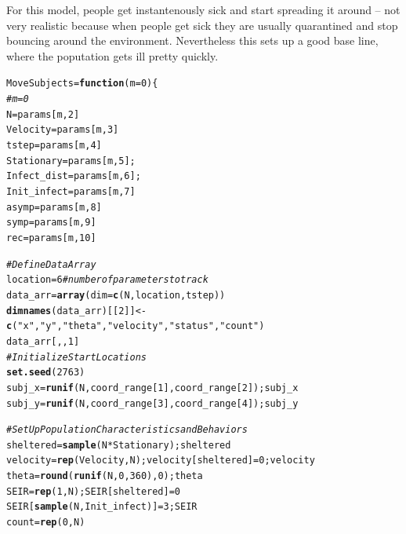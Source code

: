 \documentclass{article}\usepackage[]{graphicx}\usepackage[]{color}
\makeatletter
\newcommand{\hlnum}[1]{\textcolor[rgb]{0.686,0.059,0.569}{#1}}%
\newcommand{\hlstr}[1]{\textcolor[rgb]{0.192,0.494,0.8}{#1}}%
\newcommand{\hlcom}[1]{\textcolor[rgb]{0.678,0.584,0.686}{\textit{#1}}}%
\newcommand{\hlopt}[1]{\textcolor[rgb]{0,0,0}{#1}}%
\newcommand{\hlstd}[1]{\textcolor[rgb]{0.345,0.345,0.345}{#1}}%
\newcommand{\hlkwa}[1]{\textcolor[rgb]{0.161,0.373,0.58}{\textbf{#1}}}%
\newcommand{\hlkwb}[1]{\textcolor[rgb]{0.69,0.353,0.396}{#1}}%
\newcommand{\hlkwc}[1]{\textcolor[rgb]{0.333,0.667,0.333}{#1}}%
\newcommand{\hlkwd}[1]{\textcolor[rgb]{0.737,0.353,0.396}{\textbf{#1}}}%
\newenvironment{kframe}{%
 \def\at@end@of@kframe{}%
 \ifinner\ifhmode%
  \def\at@end@of@kframe{\end{minipage}}%
  \begin{minipage}{\columnwidth}%
 \fi\fi%
 \def\FrameCommand##1{\hskip\@totalleftmargin \hskip-\fboxsep
 \colorbox{shadecolor}{##1}\hskip-\fboxsep
     \hskip-\linewidth \hskip-\@totalleftmargin \hskip\columnwidth}%
 \MakeFramed {\advance\hsize-\width
   \@totalleftmargin\z@ \linewidth\hsize
   \@setminipage}}%
 {\par\unskip\endMakeFramed%
 \at@end@of@kframe}
\newenvironment{knitrout}{}{} %
\makeatother
\begin{document}
For this model, people get instantenously sick and start spreading it around -- not very realistic because when people get sick they are usually quarantined and stop bouncing around the environment. Nevertheless this sets up a good base line, where the poputation gets ill pretty quickly. 
\begin{knitrout}
\color{fgcolor}\begin{kframe}
\begin{alltt}
\hlstd{MoveSubjects} \hlkwb{=} \hlkwa{function}\hlstd{(}\hlkwc{m}\hlstd{=}\hlnum{0}\hlstd{)\{}
\hlcom{# m = 0}
\hlstd{N} \hlkwb{=} \hlstd{params[m,} \hlnum{2}\hlstd{]}
\hlstd{Velocity} \hlkwb{=} \hlstd{params[m,} \hlnum{3}\hlstd{]}
\hlstd{tstep} \hlkwb{=} \hlstd{params[m,} \hlnum{4}\hlstd{]}
\hlstd{Stationary} \hlkwb{=} \hlstd{params[m,}\hlnum{5}\hlstd{];}
\hlstd{Infect_dist}\hlkwb{=}\hlstd{params[m,} \hlnum{6}\hlstd{];}
\hlstd{Init_infect}\hlkwb{=}\hlstd{params[m,} \hlnum{7}\hlstd{]}
\hlstd{asymp} \hlkwb{=} \hlstd{params[m,}\hlnum{8}\hlstd{]}
\hlstd{symp} \hlkwb{=} \hlstd{params[m,}\hlnum{9}\hlstd{]}
\hlstd{rec} \hlkwb{=} \hlstd{params[m,}\hlnum{10}\hlstd{]}

\hlcom{# Define Data Array}
\hlstd{location} \hlkwb{=} \hlnum{6} \hlcom{# number of parameters to track}
\hlstd{data_arr} \hlkwb{=} \hlkwd{array}\hlstd{(}\hlkwc{dim}\hlstd{=}\hlkwd{c}\hlstd{(N, location, tstep))}
\hlkwd{dimnames}\hlstd{(data_arr)[[}\hlnum{2}\hlstd{]]} \hlkwb{<-} \hlkwd{c}\hlstd{(}\hlstr{"x"}\hlstd{,} \hlstr{"y"}\hlstd{,} \hlstr{"theta"}\hlstd{,} \hlstr{"velocity"}\hlstd{,} \hlstr{"status"}\hlstd{,} \hlstr{"count"}\hlstd{)}
\hlstd{data_arr[,,}\hlnum{1}\hlstd{]}
\hlcom{# Initialize Start Locations}
\hlkwd{set.seed}\hlstd{(}\hlnum{2763}\hlstd{)}
\hlstd{subj_x} \hlkwb{=} \hlkwd{runif}\hlstd{(N, coord_range[}\hlnum{1}\hlstd{],  coord_range[}\hlnum{2}\hlstd{]); subj_x}
\hlstd{subj_y} \hlkwb{=} \hlkwd{runif}\hlstd{(N, coord_range[}\hlnum{3}\hlstd{],  coord_range[}\hlnum{4}\hlstd{]); subj_y}

\hlcom{# Set Up Population Characteristics and Behaviors}
\hlstd{sheltered} \hlkwb{=} \hlkwd{sample}\hlstd{(N}\hlopt{*}\hlstd{Stationary); sheltered}
\hlstd{velocity} \hlkwb{=} \hlkwd{rep}\hlstd{(Velocity,N); velocity[sheltered]}\hlkwb{=}\hlnum{0}\hlstd{; velocity}
\hlstd{theta} \hlkwb{=} \hlkwd{round}\hlstd{(}\hlkwd{runif}\hlstd{(N,} \hlnum{0}\hlstd{,} \hlnum{360}\hlstd{),}\hlnum{0}\hlstd{); theta}
\hlstd{SEIR} \hlkwb{=} \hlkwd{rep}\hlstd{(}\hlnum{1}\hlstd{, N); SEIR[sheltered]} \hlkwb{=} \hlnum{0}
\hlstd{SEIR[}\hlkwd{sample}\hlstd{(N, Init_infect)]} \hlkwb{=} \hlnum{3}\hlstd{; SEIR}
\hlstd{count} \hlkwb{=} \hlkwd{rep}\hlstd{(}\hlnum{0}\hlstd{, N)}


\end{alltt}
\end{kframe}
\end{knitrout}
\end{document}
